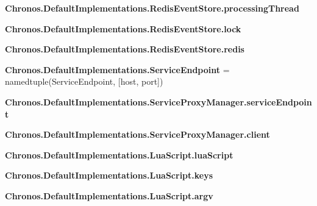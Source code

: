\begin{DoxyCompactItemize}
\item 
{\bfseries Chronos.\+Default\+Implementations.\+Redis\+Event\+Store.\+processing\+Thread}\hypertarget{group__Chronos_ga522ec1b81fa9d3f2eaa7b0d7c8ff5f35}{}\label{group__Chronos_ga522ec1b81fa9d3f2eaa7b0d7c8ff5f35}

\item 
{\bfseries Chronos.\+Default\+Implementations.\+Redis\+Event\+Store.\+lock}\hypertarget{group__Chronos_ga9cea4f83d6002e4a0ce7243b7f2b5620}{}\label{group__Chronos_ga9cea4f83d6002e4a0ce7243b7f2b5620}

\item 
{\bfseries Chronos.\+Default\+Implementations.\+Redis\+Event\+Store.\+redis}\hypertarget{group__Chronos_ga710aa8f1e3c0b8cd910d2fb182dc5cb7}{}\label{group__Chronos_ga710aa8f1e3c0b8cd910d2fb182dc5cb7}

\item 
{\bfseries Chronos.\+Default\+Implementations.\+Service\+Endpoint} = namedtuple(\textquotesingle{}Service\+Endpoint\textquotesingle{}, \mbox{[}\textquotesingle{}host\textquotesingle{}, \textquotesingle{}port\textquotesingle{}\mbox{]})\hypertarget{group__Chronos_ga735efd61bba33f6e9eb58027fb9d94b4}{}\label{group__Chronos_ga735efd61bba33f6e9eb58027fb9d94b4}

\item 
{\bfseries Chronos.\+Default\+Implementations.\+Service\+Proxy\+Manager.\+service\+Endpoint}\hypertarget{group__Chronos_ga0d68687ca42d34076d8de16f7e5edad0}{}\label{group__Chronos_ga0d68687ca42d34076d8de16f7e5edad0}

\item 
{\bfseries Chronos.\+Default\+Implementations.\+Service\+Proxy\+Manager.\+client}\hypertarget{group__Chronos_ga67493fafe02509d5c5ac052e839c050a}{}\label{group__Chronos_ga67493fafe02509d5c5ac052e839c050a}

\item 
{\bfseries Chronos.\+Default\+Implementations.\+Lua\+Script.\+lua\+Script}\hypertarget{group__Chronos_ga449ad9410ec78d45fbc03862dadc63f7}{}\label{group__Chronos_ga449ad9410ec78d45fbc03862dadc63f7}

\item 
{\bfseries Chronos.\+Default\+Implementations.\+Lua\+Script.\+keys}\hypertarget{group__Chronos_gad7b50546875b3903a285b3c2575c3011}{}\label{group__Chronos_gad7b50546875b3903a285b3c2575c3011}

\item 
{\bfseries Chronos.\+Default\+Implementations.\+Lua\+Script.\+argv}\hypertarget{group__Chronos_gabb8223cb2b126f339a9512033b17c53a}{}\label{group__Chronos_gabb8223cb2b126f339a9512033b17c53a}


\end{DoxyCompactItemize}
